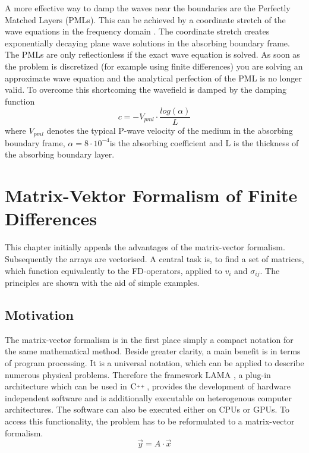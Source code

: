 \documentclass[pdftex,a4paper,parskip,listof=totoc,bibliography=totoc,onehalfspacing,12pt]{scrreprt}
\newcommand{\CC}[1][]{$\text{C\hspace{0ex}}^{_{_{_{++}}}}					%
                      \ifthenelse{\equal{#1}{}}{}{\text{\hspace{-.625ex}#1}}$}
\begin{document}
A more effective way to damp the waves near the boundaries are the Perfectly Matched Layers (PMLs). This can be achieved by a coordinate stretch of the wave equations in the frequency domain \cite{komatitsch:07}. The coordinate stretch creates exponentially decaying plane wave solutions in the absorbing boundary frame. The PMLs are only reflectionless if the exact wave equation is solved. As soon as the problem is discretized (for example using finite differences) you are solving an approximate wave equation and the analytical perfection of the PML is no longer valid. To overcome this shortcoming the wavefield is damped by the damping function 
\begin{equation}
	c=-V_{pml} \cdot \frac{log(\alpha)}{L}
\end{equation}
where $V_{pml}$ denotes the typical P-wave velocity of the medium in the absorbing boundary frame, $\alpha=8 \cdot 10^{-4}$is the absorbing coefficient and L is the thickness of the absorbing boundary layer.

\cleardoublepage
\chapter{Matrix-Vektor Formalism of Finite Differences}
This chapter initially appeals the advantages of the matrix-vector formalism. Subsequently the arrays are vectorised. A central task is, to find a set of matrices, which function equivalently to the FD-operators, applied to $v_i$ and $\sigma_{ij}$. The principles are shown with the aid of simple examples. 
\section{Motivation}
The matrix-vector formalism is in the first place simply a compact notation for the same mathematical method. Beside greater clarity, a main benefit is in terms of program processing. It is a universal notation, which can be applied to describe numerous physical problems. Therefore the framework LAMA \citep{lama:16}, a plug-in architecture which can be used in \CC, provides the development of hardware independent software and is additionally executable on heterogenous computer architectures. The software can also be executed either on CPUs or GPUs. To access this functionality, the problem has to be reformulated to a matrix-vector formalism. 
\begin{equation}
	\vec{y} = A\cdot\vec{x}
\end{equation}
\end{document}
